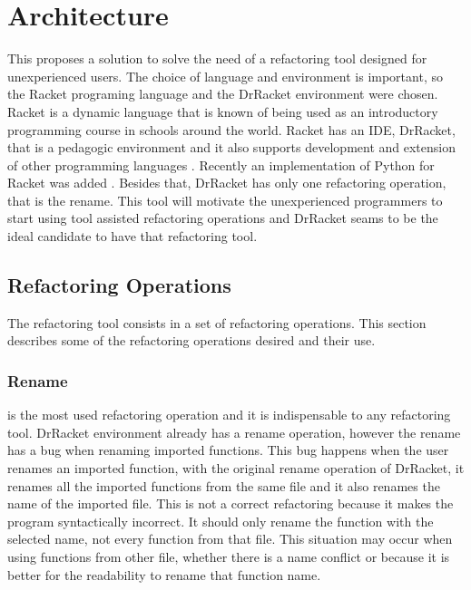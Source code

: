 
% 
% 

\section{Architecture}

This proposes a solution to solve the need of a refactoring tool designed for unexperienced users.
The choice of language and environment is important, so the Racket programing language and the DrRacket environment were chosen.
Racket is a dynamic language that is known of being used as an introductory programming course in schools around the world. 
Racket has an IDE, DrRacket, that is a pedagogic environment \cite{drscheme_pegadogy} and it also supports development and extension of other programming languages \cite{tobin2011languages}. 
Recently  an implementation of Python for Racket was added \cite{ramos2014implementation}.
Besides that, DrRacket has only one refactoring operation, that is the rename.
This tool will motivate the unexperienced programmers to start using tool assisted refactoring operations and DrRacket seams to be the ideal candidate to have that refactoring tool.


\subsection{Refactoring Operations}
The refactoring tool consists in a set of refactoring operations.
This section describes some of the refactoring operations desired and their use.

\subsubsection{Rename}
\label{ssub:Rename}
is the most used refactoring operation and it is indispensable to any refactoring tool.
DrRacket environment already has a rename operation, however the rename has a bug when renaming imported functions.
This bug happens when the user renames an imported function, with the original rename operation of DrRacket, it renames all the imported functions from the same file and it also renames the name of the imported file.
This is not a correct refactoring because it makes the program syntactically incorrect. It should only rename the function with the selected name, not every function from that file.
This situation may occur when using functions from other file, whether there is a name conflict or because it is better for the readability to rename that function name.


